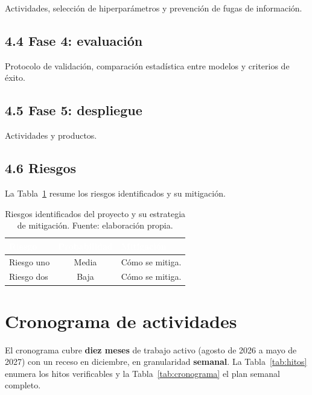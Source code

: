\documentclass[12pt,letterpaper]{report}
\begin{document}
Actividades, selección de hiperparámetros y prevención de fugas de información.

\section{4.4 Fase 4: evaluación}

Protocolo de validación, comparación estadística entre modelos y criterios de éxito.

\section{4.5 Fase 5: despliegue}

Actividades y productos.

\section{4.6 Riesgos}

La Tabla~\ref{tab:riesgos} resume los riesgos identificados y su mitigación.

\begin{table}[H]
    \centering
    \footnotesize
    \setlength{\arrayrulewidth}{0.7pt}
    \begin{tabular}{>{\raggedright\arraybackslash}p{4.0cm} c >{\raggedright\arraybackslash}p{6.4cm}}
        \hline
        \rowcolor{colorprimario!90}
        \textcolor{white}{\textbf{Riesgo}} & \textcolor{white}{\textbf{Probabilidad}} & \textcolor{white}{\textbf{Mitigación}} \\
        \hline
        \rowcolor{colorprimario!8}
        Riesgo uno & Media & Cómo se mitiga. \\
        Riesgo dos & Baja & Cómo se mitiga. \\
        \hline
    \end{tabular}
    \caption[Riesgos y mitigación.]{Riesgos identificados del proyecto y su estrategia de mitigación. Fuente: elaboración propia.}
    \label{tab:riesgos}
\end{table}

\chapter{Cronograma de actividades}

El cronograma cubre \textbf{diez meses} de trabajo activo (agosto de 2026 a mayo de 2027) con un receso en diciembre, en granularidad \textbf{semanal}. La Tabla~\ref{tab:hitos} enumera los hitos verificables y la Tabla~\ref{tab:cronograma} el plan semanal completo.
\end{document}
